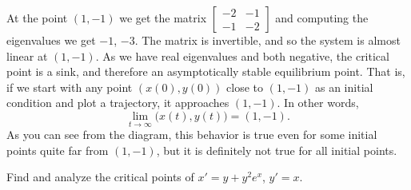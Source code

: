 \documentclass{ximera}
\begin{document}
\begin{exampleSol}
    At the point $(1,-1)$ we get the matrix 
    $\left[ \begin{smallmatrix} -2 & -1 \\ -1 & -2 \end{smallmatrix} \right]$ 
    and computing the eigenvalues we get $-1$, $-3$. The matrix is invertible, and so the system is almost linear at $(1,-1)$. As we have real eigenvalues and both negative, the critical point is a sink, and therefore an asymptotically stable equilibrium point. That is, if we start with any point $(x(0),y(0))$ close to $(1,-1)$ as an initial condition and plot a trajectory, it approaches $(1,-1)$. In other words,
    \begin{equation*}
        \lim_{t \to \infty} \bigl( x(t), y(t) \bigr) = (1,-1) .
    \end{equation*}
    As you can see from the diagram, this behavior is true even for some initial points quite far from $(1,-1)$, but it is definitely not true for all initial points.
\end{exampleSol}

\begin{example} \label{example:nlin-withexp}
    Find and analyze the critical points of $x'=y+y^2e^x$, $y'=x$.
\end{example}
\end{document}
